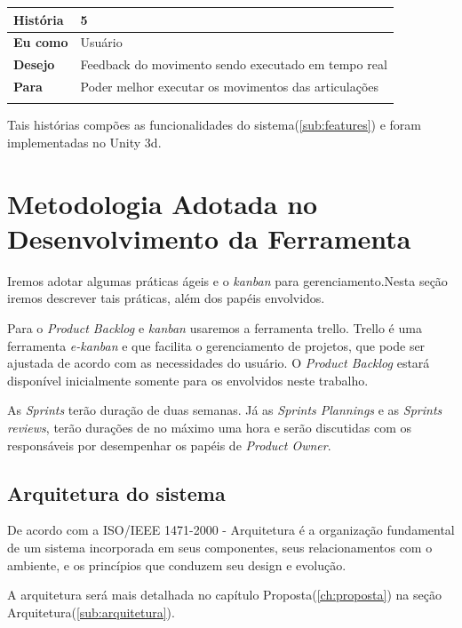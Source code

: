 \begin{table}[H]
\begin{tabular}{|l|l|}
\textbf{História} & 5                                                        \\ \hline
\textbf{Eu como}  & Usuário                                                  \\ \hline
\textbf{Desejo}   & Feedback do movimento sendo executado em tempo real                    \\ \hline
\textbf{Para}     & Poder melhor executar os movimentos das articulações           \\ \hline
\multicolumn{2}{|l|}{}                                                       \\ \hline

\end{tabular}
\end{table}

  Tais histórias compões as funcionalidades do sistema(\ref{sub:features}) e foram implementadas no Unity 3d.

\section{Metodologia Adotada no Desenvolvimento da Ferramenta}
  Iremos adotar algumas práticas ágeis e o \textit{kanban}\cite{kanban}
 para gerenciamento.Nesta seção iremos descrever tais práticas,
além dos papéis envolvidos.

  Para o \textit{Product Backlog} e \textit{kanban}  usaremos a ferramenta trello. Trello é uma ferramenta
\textit{e-kanban}\cite{kanban} e que facilita o gerenciamento de projetos, que pode ser ajustada de acordo com as necessidades
do usuário. O \textit{Product Backlog} estará disponível inicialmente somente para
os envolvidos neste trabalho.

  As \textit{Sprints} terão duração de duas semanas. Já as \textit{Sprints Plannings}
e as \textit{Sprints reviews}, terão durações de no máximo uma hora e serão
discutidas com os responsáveis por desempenhar os papéis de \textit{Product Owner}.


\subsection{Arquitetura do sistema}
\label{Sec:arquitetura}
  De acordo com a ISO/IEEE 1471-2000 - Arquitetura é a organização fundamental
de um sistema incorporada em seus componentes, seus relacionamentos com o
ambiente, e os princípios que conduzem seu design e evolução.

  A arquitetura será mais detalhada no capítulo Proposta(\ref{ch:proposta}) na seção Arquitetura(\ref{sub:arquitetura}).

